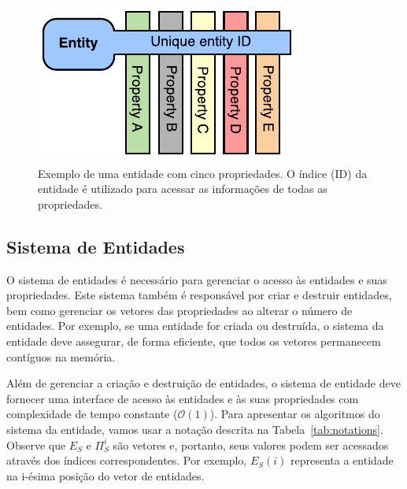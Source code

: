 \begin{figure}[ht]
    \centering
    \includegraphics[width=0.5\linewidth]{img/tecnica/entity}
    \caption[Exemplo de uma entidade]{Exemplo de uma entidade com cinco propriedades. O índice (ID) da entidade é utilizado para acessar as informações de todas as propriedades.}
    \label{fig:entity_example}
\end{figure}

\subsection{Sistema de Entidades}

O sistema de entidades é necessário para gerenciar o acesso às entidades e suas propriedades. Este sistema também é responsável por criar e destruir entidades, bem como gerenciar os vetores das propriedades ao alterar o número de entidades. Por exemplo, se uma entidade for criada ou destruída, o sistema da entidade deve assegurar, de forma eficiente, que todos os vetores permanecem contíguos na memória.

Além de gerenciar a criação e destruição de entidades, o sistema de entidade deve fornecer uma interface de acesso às entidades e às suas propriedades com complexidade de tempo constante  ($\mathcal{O}(1)$). Para apresentar os algoritmos do sistema da entidade, vamos usar a notação descrita na Tabela~\ref{tab:notations}. Observe que $E_S$ e $\Pi^i_S$ são vetores e, portanto, seus valores podem ser acessados através dos índices correspondentes. Por exemplo, $E_S(i)$ representa a entidade na i-ésima posição do vetor de entidades.

